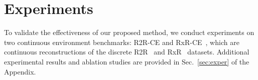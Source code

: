 \documentclass{article}
\theoremstyle{plain}
\theoremstyle{definition}
\theoremstyle{remark}
\begin{document}
\section{Experiments} \label{sec:expr}
To validate the effectiveness of our proposed method, we conduct experiments on two continuous environment benchmarks: R2R-CE and RxR-CE~\cite{krantz2020beyond}, which are continuous reconstructions of the discrete R2R~\cite{anderson2018vision} and RxR~\cite{ku2020room} datasets. 
Additional experimental results and ablation studies are provided in Sec.~\ref{sec:exper} of the Appendix.


\begin{table}[thpb] \centering
	\caption{Experimental results on R2R-CE dataset. Results better than \textbf{base model} are shown in \textcolor{blue}{blue}. Best results for {both panoramic and monocular settings} are $\underline{\text{underlined}}$. * indicates experimental results that we have reproduced.}
	\vspace{0mm}
	\label{tab:r2r-ce}
\end{table}
\end{document}
